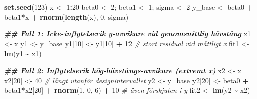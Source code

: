 \documentclass[
  11pt,
]{article}
\newenvironment{Shaded}{\begin{snugshade}}{\end{snugshade}}
\newcommand{\CommentTok}[1]{\textcolor[rgb]{0.56,0.35,0.01}{\textit{#1}}}
\newcommand{\DecValTok}[1]{\textcolor[rgb]{0.00,0.00,0.81}{#1}}
\newcommand{\DocumentationTok}[1]{\textcolor[rgb]{0.56,0.35,0.01}{\textbf{\textit{#1}}}}
\newcommand{\FunctionTok}[1]{\textcolor[rgb]{0.13,0.29,0.53}{\textbf{#1}}}
\newcommand{\NormalTok}[1]{#1}
\newcommand{\OtherTok}[1]{\textcolor[rgb]{0.56,0.35,0.01}{#1}}
\newcommand{\SpecialCharTok}[1]{\textcolor[rgb]{0.81,0.36,0.00}{\textbf{#1}}}
\begin{document}
\begin{Shaded}
\begin{Highlighting}[]
\FunctionTok{set.seed}\NormalTok{(}\DecValTok{123}\NormalTok{)}
\NormalTok{x }\OtherTok{\textless{}{-}} \DecValTok{1}\SpecialCharTok{:}\DecValTok{20}
\NormalTok{beta0 }\OtherTok{\textless{}{-}} \DecValTok{2}\NormalTok{; beta1 }\OtherTok{\textless{}{-}} \DecValTok{1}\NormalTok{; sigma }\OtherTok{\textless{}{-}} \DecValTok{2}
\NormalTok{y\_base }\OtherTok{\textless{}{-}}\NormalTok{ beta0 }\SpecialCharTok{+}\NormalTok{ beta1}\SpecialCharTok{*}\NormalTok{x }\SpecialCharTok{+} \FunctionTok{rnorm}\NormalTok{(}\FunctionTok{length}\NormalTok{(x), }\DecValTok{0}\NormalTok{, sigma)}

\DocumentationTok{\#\# Fall 1: Icke{-}inflytelserik y{-}avvikare vid genomsnittlig hävstång}
\NormalTok{x1 }\OtherTok{\textless{}{-}}\NormalTok{ x}
\NormalTok{y1 }\OtherTok{\textless{}{-}}\NormalTok{ y\_base}
\NormalTok{y1[}\DecValTok{10}\NormalTok{] }\OtherTok{\textless{}{-}}\NormalTok{ y1[}\DecValTok{10}\NormalTok{] }\SpecialCharTok{+} \DecValTok{12}     \CommentTok{\# stort residual vid måttligt x}
\NormalTok{fit1 }\OtherTok{\textless{}{-}} \FunctionTok{lm}\NormalTok{(y1 }\SpecialCharTok{\textasciitilde{}}\NormalTok{ x1)}

\DocumentationTok{\#\# Fall 2: Inflytelserik hög{-}hävstångs{-}avvikare (extremt x)}
\NormalTok{x2 }\OtherTok{\textless{}{-}}\NormalTok{ x}
\NormalTok{x2[}\DecValTok{20}\NormalTok{] }\OtherTok{\textless{}{-}} \DecValTok{40}              \CommentTok{\# långt utanför designintervallet}
\NormalTok{y2 }\OtherTok{\textless{}{-}}\NormalTok{ y\_base}
\NormalTok{y2[}\DecValTok{20}\NormalTok{] }\OtherTok{\textless{}{-}}\NormalTok{ beta0 }\SpecialCharTok{+}\NormalTok{ beta1}\SpecialCharTok{*}\NormalTok{x2[}\DecValTok{20}\NormalTok{] }\SpecialCharTok{+} \FunctionTok{rnorm}\NormalTok{(}\DecValTok{1}\NormalTok{, }\DecValTok{0}\NormalTok{, }\DecValTok{6}\NormalTok{) }\SpecialCharTok{+} \DecValTok{10}  \CommentTok{\# även förskjuten i y}
\NormalTok{fit2 }\OtherTok{\textless{}{-}} \FunctionTok{lm}\NormalTok{(y2 }\SpecialCharTok{\textasciitilde{}}\NormalTok{ x2)}


\end{Highlighting}
\end{Shaded}
\end{document}
